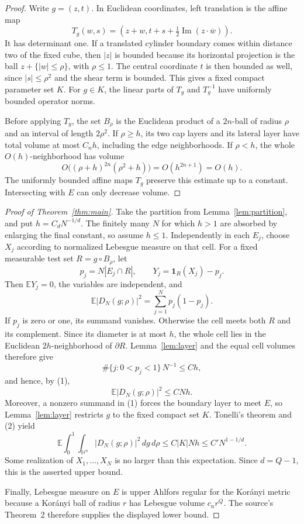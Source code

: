 \documentclass[11pt]{article}
\newcommand{\HH}{\mathbb H}
\begin{document}
\begin{proof}
Write \(g=(z,t)\).  In Euclidean coordinates, left translation is the affine
map
\[
 T_g(w,s)=
 \left(z+w,t+s+\tfrac12\operatorname{Im}(z\cdot\overline w)\right).
\]
It has determinant one.  If a translated cylinder boundary comes within
distance two of the fixed cube, then \(|z|\) is bounded because its horizontal
projection is the ball \(z+\{|w|\leq\rho\}\), with \(\rho\leq1\).  The central
coordinate \(t\) is then bounded as well, since \(|s|\leq\rho^2\) and the shear
term is bounded.  This gives a fixed compact parameter set \(K\).  For
\(g\in K\), the linear parts of \(T_g\) and \(T_g^{-1}\) have uniformly
bounded operator norms.

Before applying \(T_g\), the set \(B_\rho\) is the Euclidean product of a
\(2n\)-ball of radius \(\rho\) and an interval of length \(2\rho^2\).  If
\(\rho\geq h\), its two cap layers and its lateral layer have total volume at
most \(C_nh\), including the edge neighborhoods.  If \(\rho<h\), the whole
\(O(h)\)-neighborhood has volume
\[
 O\big((\rho+h)^{2n}(\rho^2+h)\big)=O(h^{2n+1})=O(h).
\]
The uniformly bounded affine maps \(T_g\) preserve this estimate up to a
constant.  Intersecting with \(E\) can only decrease volume.
\end{proof}

\begin{proof}[Proof of Theorem~\ref{thm:main}]
Take the partition from Lemma~\ref{lem:partition}, and put
\(h=C_dN^{-1/d}\).  The finitely many \(N\) for which \(h>1\) are absorbed by
enlarging the final constant, so assume \(h\leq1\).  Independently in each
\(E_j\), choose \(X_j\) according
to normalized Lebesgue measure on that cell.  For a fixed measurable test set
\(R=g\circ B_\rho\), let
\[
 p_j=N|E_j\cap R|,
 \qquad
 Y_j=\mathbf 1_R(X_j)-p_j.
\]
Then \(\mathbb E Y_j=0\), the variables are independent, and
\[
 \mathbb E|D_N(g;\rho)|^2
 =\sum_{j=1}^N p_j(1-p_j).
\tag{1}
\]
If \(p_j\) is zero or one, its summand vanishes.  Otherwise the cell meets
both \(R\) and its complement.  Since its diameter is at most \(h\), the
whole cell lies in the Euclidean \(2h\)-neighborhood of \(\partial R\).
Lemma~\ref{lem:layer} and the equal cell volumes therefore give
\[
 \#\{j:0<p_j<1\}\,N^{-1}\leq Ch,
\]
and hence, by (1),
\[
 \mathbb E|D_N(g;\rho)|^2\leq CNh.
\tag{2}
\]
Moreover, a nonzero summand in (1) forces the boundary layer to meet \(E\),
so Lemma~\ref{lem:layer} restricts \(g\) to the fixed compact set \(K\).
Tonelli's theorem and (2) yield
\[
 \mathbb E\int_0^1\int_{\HH^n}|D_N(g;\rho)|^2\,dg\,d\rho
 \leq C|K|Nh
 \leq C'N^{1-1/d}.
\]
Some realization of \(X_1,\ldots,X_N\) is no larger than this expectation.
Since \(d=Q-1\), this is the asserted upper bound.

Finally, Lebesgue measure on \(E\) is upper Ahlfors regular for the Kor\'anyi
metric because a Kor\'anyi ball of radius \(r\) has Lebesgue volume
\(c_nr^Q\).  The source's Theorem~2 therefore supplies the displayed lower
bound.
\end{proof}
\end{document}
